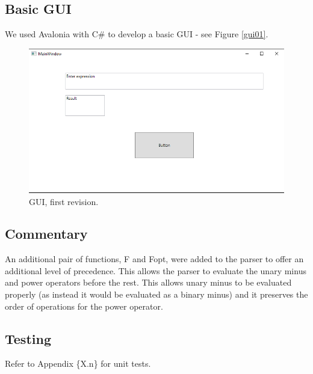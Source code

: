 \documentclass[a4paper, oneside, 11pt]{report}
\begin{document}
    \subsection{Basic GUI}
    We used Avalonia with C\# to develop a basic GUI - see Figure \ref{gui01}.
    \begin{figure}[htb]
        \begin{center}

            \includegraphics[width=0.9 \columnwidth]{GUI_01}

            \caption{GUI, first revision.}
            \label{GUI_01}
        \end{center}
    \end{figure}

    \subsection{Commentary}
    An additional pair of functions, F and Fopt, were added to the parser to offer an additional level of precedence. This allows the parser to evaluate the unary minus and power operators before the rest. This allows unary minus to be evaluated properly (as instead it would be evaluated as a binary minus) and it preserves the order of operations for the power operator.

    \subsection{Testing}
    Refer to Appendix \{X.n\} for unit tests.

    \clearpage
\end{document}
